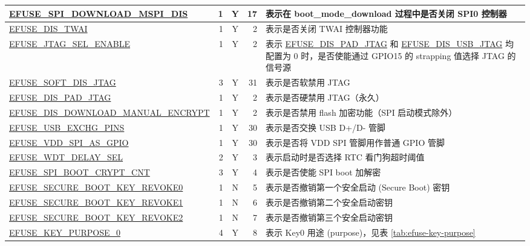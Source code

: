 \begin{longtable}[l]{ |m{8.2cm}|r|c|r|m{9.3cm}| }
    \hline
    \hyperref[fielddesc:EFUSESPIDOWNLOADMSPIDIS]{EFUSE\_SPI\_DOWNLOAD\_MSPI\_DIS} & 1 & Y & 17 & 表示在 boot\_mode\_download 过程中是否关闭 SPI0 控制器 \\  
    \hline    
    \hyperref[fielddesc:EFUSEDISTWAI]{EFUSE\_DIS\_TWAI} & 1 & Y & 2 & 表示是否关闭 TWAI 控制器功能 \\  
    \hline
    \hyperref[fielddesc:EFUSEJTAGSELENABLE]{EFUSE\_JTAG\_SEL\_ENABLE} & 1 & Y & 2 & 表示 \hyperref[fielddesc:EFUSEDISPADJTAG]{EFUSE\_DIS\_PAD\_JTAG} 和 \hyperref[fielddesc:EFUSEDISUSBJTAG]{EFUSE\_DIS\_USB\_JTAG} 均配置为 0 时，是否使能通过 GPIO15 的 strapping 值选择 JTAG 的信号源\\   
    \hline
    \hyperref[fielddesc:EFUSESOFTDISJTAG]{EFUSE\_SOFT\_DIS\_JTAG} & 3 & Y & 31 & 表示是否软禁用 JTAG\\    
    \hline
    \hyperref[fielddesc:EFUSEDISPADJTAG]{EFUSE\_DIS\_PAD\_JTAG} & 1 & Y & 2 & 表示是否硬禁用 JTAG（永久） \\   
    \hline
    \hyperref[fielddesc:EFUSEDISDOWNLOADMANUALENCRYPT]{EFUSE\_DIS\_DOWNLOAD\_MANUAL\_ENCRYPT} &  1 & Y & 2 & 表示是否禁用 flash 加密功能（SPI 启动模式除外）\\ 
    \hline
    \hyperref[fielddesc:EFUSEUSBEXCHGPINS]{EFUSE\_USB\_EXCHG\_PINS} & 1 & Y & 30 & 表示是否交换 USB D+/D- 管脚 \\
    \hline
    \hyperref[fielddesc:EFUSEVDDSPIASGPIO]{EFUSE\_VDD\_SPI\_AS\_GPIO} & 1 & Y & 30 & 表示是否将 VDD SPI 管脚用作普通 GPIO 管脚 \\
    \hline
    \hyperref[fielddesc:EFUSEWDTDELAYSEL]{EFUSE\_WDT\_DELAY\_SEL} & 2 & Y & 3 & 表示启动时是否选择 RTC 看门狗超时阈值 \\
    \hline
    \hyperref[fielddesc:EFUSESPIBOOTCRYPTCNT]{EFUSE\_SPI\_BOOT\_CRYPT\_CNT} & 3 & Y & 4 & 表示是否使能 SPI boot 加解密\\
    \hline
    \hyperref[fielddesc:EFUSESECUREBOOTKEYREVOKE0]{EFUSE\_SECURE\_BOOT\_KEY\_REVOKE0} & 1 & N & 5 & 表示是否撤销第一个安全启动 (Secure Boot) 密钥 \\
    \hline
    \hyperref[fielddesc:EFUSESECUREBOOTKEYREVOKE1]{EFUSE\_SECURE\_BOOT\_KEY\_REVOKE1} & 1 & N & 6 & 表示是否撤销第二个安全启动密钥 \\
    \hline
    \hyperref[fielddesc:EFUSESECUREBOOTKEYREVOKE2]{EFUSE\_SECURE\_BOOT\_KEY\_REVOKE2} & 1 & N & 7 & 表示是否撤销第三个安全启动密钥 \\
    \hline
    \hyperref[fielddesc:EFUSEKEYPURPOSE0]{EFUSE\_KEY\_PURPOSE\_0} & 4 & Y & 8 & {表示 Key0 用途 (purpose)，见表 \ref{tab:efuse-key-purpose}} \\

\end{longtable}
